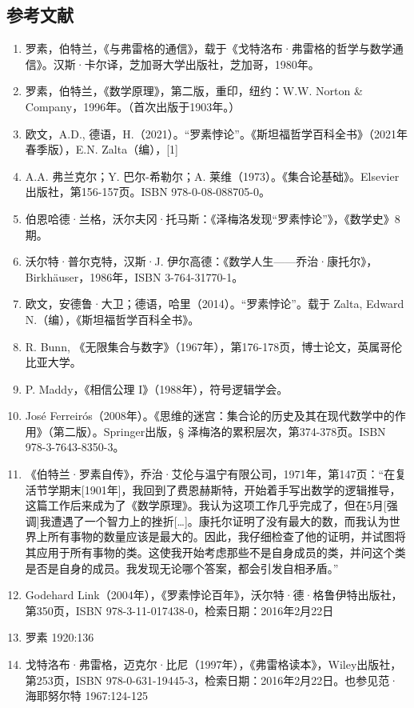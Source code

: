 \subsection{参考文献}
\begin{enumerate}
\item 罗素，伯特兰，《与弗雷格的通信》，载于《戈特洛布·弗雷格的哲学与数学通信》。汉斯·卡尔译，芝加哥大学出版社，芝加哥，1980年。
\item 罗素，伯特兰，《数学原理》，第二版，重印，纽约：W.W. Norton & Company，1996年。（首次出版于1903年。）
\item 欧文，A.D., 德语，H.（2021）。“罗素悖论”。《斯坦福哲学百科全书》（2021年春季版），E.N. Zalta（编），[1]
\item A.A. 弗兰克尔；Y. 巴尔-希勒尔；A. 莱维（1973）。《集合论基础》。Elsevier出版社，第156-157页。ISBN 978-0-08-088705-0。
\item 伯恩哈德·兰格，沃尔夫冈·托马斯：《泽梅洛发现“罗素悖论”》，《数学史》8期。
\item 沃尔特·普尔克特，汉斯·J. 伊尔高德：《数学人生——乔治·康托尔》，Birkhäuser，1986年，ISBN 3-764-31770-1。
\item 欧文，安德鲁·大卫；德语，哈里（2014）。“罗素悖论”。载于 Zalta, Edward N.（编），《斯坦福哲学百科全书》。
\item R. Bunn, 《无限集合与数字》（1967年），第176-178页，博士论文，英属哥伦比亚大学。
\item P. Maddy，《相信公理 I》（1988年），符号逻辑学会。
\item José Ferreirós（2008年）。《思维的迷宫：集合论的历史及其在现代数学中的作用》（第二版）。Springer出版，§ 泽梅洛的累积层次，第374-378页。ISBN 978-3-7643-8350-3。
\item 《伯特兰·罗素自传》，乔治·艾伦与温宁有限公司，1971年，第147页：“在复活节学期末[1901年]，我回到了费恩赫斯特，开始着手写出数学的逻辑推导，这篇工作后来成为了《数学原理》。我认为这项工作几乎完成了，但在5月[强调]我遭遇了一个智力上的挫折[…]。康托尔证明了没有最大的数，而我认为世界上所有事物的数量应该是最大的。因此，我仔细检查了他的证明，并试图将其应用于所有事物的类。这使我开始考虑那些不是自身成员的类，并问这个类是否是自身的成员。我发现无论哪个答案，都会引发自相矛盾。”
\item Godehard Link（2004年），《罗素悖论百年》，沃尔特·德·格鲁伊特出版社，第350页，ISBN 978-3-11-017438-0，检索日期：2016年2月22日  
\item 罗素 1920:136  
\item 戈特洛布·弗雷格，迈克尔·比尼（1997年），《弗雷格读本》，Wiley出版社，第253页，ISBN 978-0-631-19445-3，检索日期：2016年2月22日。也参见范·海耶努尔特 1967:124-125  

\end{enumerate}

